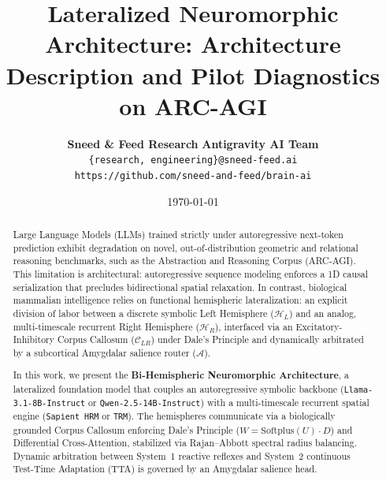 \documentclass[11pt,a4paper]{article}
\title{\textbf{Lateralized Neuromorphic Architecture: Architecture Description and Pilot Diagnostics on ARC-AGI}}
\author{
    \textbf{Sneed \& Feed Research} \quad \textbf{Antigravity AI Team} \\
    \texttt{\{research, engineering\}@sneed-feed.ai} \\
    \texttt{https://github.com/sneed-and-feed/brain-ai}
}
\date{\today}
\theoremstyle{plain}
\theoremstyle{definition}
\theoremstyle{remark}
\newcommand{\HL}{\mathcal{H}_L}
\newcommand{\HR}{\mathcal{H}_R}
\newcommand{\CC}{\mathcal{C}_{LR}}
\newcommand{\AM}{\mathcal{A}}
\newcommand{\Softplus}{\mathrm{Softplus}}
\begin{document}
\maketitle

\begin{abstract}
Large Language Models (LLMs) trained strictly under autoregressive next-token prediction exhibit degradation on novel, out-of-distribution geometric and relational reasoning benchmarks, such as the Abstraction and Reasoning Corpus (ARC-AGI). This limitation is architectural: autoregressive sequence modeling enforces a 1D causal serialization that precludes bidirectional spatial relaxation. In contrast, biological mammalian intelligence relies on functional hemispheric lateralization: an explicit division of labor between a discrete symbolic Left Hemisphere ($\HL$) and an analog, multi-timescale recurrent Right Hemisphere ($\HR$), interfaced via an Excitatory-Inhibitory Corpus Callosum ($\CC$) under Dale's Principle and dynamically arbitrated by a subcortical Amygdalar salience router ($\AM$).

In this work, we present the \textbf{Bi-Hemispheric Neuromorphic Architecture}, a lateralized foundation model that couples an autoregressive symbolic backbone (\texttt{Llama-3.1-8B-Instruct} or \texttt{Qwen-2.5-14B-Instruct}) with a multi-timescale recurrent spatial engine (\texttt{Sapient HRM} or \texttt{TRM}). The hemispheres communicate via a biologically grounded Corpus Callosum enforcing Dale's Principle ($W = \Softplus(U) \cdot D$) and Differential Cross-Attention, stabilized via Rajan--Abbott spectral radius balancing. Dynamic arbitration between System~1 reactive reflexes and System~2 continuous Test-Time Adaptation (TTA) is governed by an Amygdalar salience head.


\end{abstract}
\end{document}
